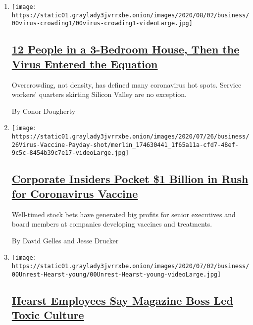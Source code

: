 \begin{enumerate}
\def\labelenumi{\arabic{enumi}.}
\item
  \texttt{[image: https://static01.graylady3jvrrxbe.onion/images/2020/08/02/business/00virus-crowding1/00virus-crowding1-videoLarge.jpg]}

  \hypertarget{12-people-in-a-3-bedroom-house-then-the-virus-entered-the-equation}{%
  \subsection{\texorpdfstring{\href{/2020/08/01/business/economy/housing-overcrowding-coronavirus.html}{12
  People in a 3-Bedroom House, Then the Virus Entered the
  Equation}}{12 People in a 3-Bedroom House, Then the Virus Entered the Equation}}\label{12-people-in-a-3-bedroom-house-then-the-virus-entered-the-equation}}

  Overcrowding, not density, has defined many coronavirus hot spots.
  Service workers' quarters skirting Silicon Valley are no exception.

  By Conor Dougherty
\item
  \texttt{[image: https://static01.graylady3jvrrxbe.onion/images/2020/07/26/business/26Virus-Vaccine-Payday-shot/merlin\_174630441\_1f65a11a-cfd7-48ef-9c5c-8454b39c7e17-videoLarge.jpg]}

  \hypertarget{corporate-insiders-pocket-1-billion-in-rush-for-coronavirus-vaccine}{%
  \subsection{\texorpdfstring{\href{/2020/07/25/business/coronavirus-vaccine-profits-vaxart.html}{Corporate
  Insiders Pocket \$1 Billion in Rush for Coronavirus
  Vaccine}}{Corporate Insiders Pocket \$1 Billion in Rush for Coronavirus Vaccine}}\label{corporate-insiders-pocket-1-billion-in-rush-for-coronavirus-vaccine}}

  Well-timed stock bets have generated big profits for senior executives
  and board members at companies developing vaccines and treatments.

  By David Gelles and Jesse Drucker
\item
  \texttt{[image: https://static01.graylady3jvrrxbe.onion/images/2020/07/02/business/00Unrest-Hearst-young/00Unrest-Hearst-young-videoLarge.jpg]}

  \hypertarget{hearst-employees-say-magazine-boss-led-toxic-culture}{%
  \subsection{\texorpdfstring{\href{/2020/07/22/business/media/hearst-harassment-troy-young.html}{Hearst
  Employees Say Magazine Boss Led Toxic
  Culture}}{Hearst Employees Say Magazine Boss Led Toxic Culture}}\label{hearst-employees-say-magazine-boss-led-toxic-culture}}


\end{enumerate}

